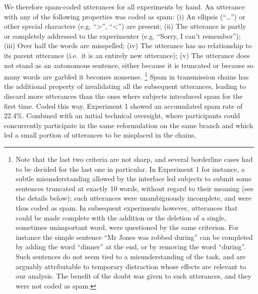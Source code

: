 \documentclass[a4paper,fleqn]{cas-dc}
\begin{document}
We therefore spam-coded utterances for all experiments by hand. An utterance
with any of the following properties was coded as spam:
(i)
  An ellipsis (\enquote{\ldots{}}) or other special characters (e.g.
  \enquote{\textgreater{}}, \enquote{\textless{}}) are present;
(ii)
  The utterance is partly or completely addressed to the experimenter
  (e.g. \enquote{Sorry, I can't remember});
(iii)
  Over half the words are misspelled;
(iv)
  The utterance has no relationship to its parent utterance (i.e.~it is
  an entirely new utterance);
(v)
  The utterance does not stand as an autonomous sentence, either because
  it is truncated or because so many words are garbled it becomes
  nonsense.
\footnote{Note that the last two criteria are not sharp, and several borderline
cases had to be decided for the last one in particular. In Experiment 1
for instance, a subtle misunderstanding allowed by the interface led
subjects to submit some sentences truncated at exactly 10 words, without
regard to their meaning (see the details below); such utterances were
unambiguously incomplete, and were thus coded as spam. In subsequent
experiments however, utterances that could be made complete with the
addition or the deletion of a single, sometimes unimportant word, were
questioned by the same criterion. For instance the simple sentence
\enquote{Mr Jones was robbed during} can be completed by adding the word
\enquote{dinner} at the end, or by removing the word \enquote{during}.
Such sentences do not seem tied to a misunderstanding of the task, and
are arguably attributable to temporary distraction whose effects are
relevant to our analysis. The benefit of the doubt was given to such
utterances, and they were not coded as spam.}
Spam in transmission chains has the additional property of invalidating
all the subsequent utterances, leading to discard more utterances than the ones where subjects introduced spam for the first time.
Coded this way, Experiment 1 showed an accumulated spam rate of 22.4\%.
Combined with an initial technical oversight, where participants could concurrently participate in the same reformulation on the same branch and which led a small portion of
utterances to be misplaced in the chains,
\end{document}

